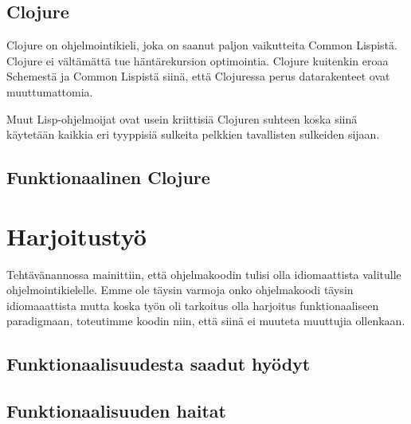 \documentclass[12pt]{article}
\begin{document}
\subsection{Clojure}
Clojure on ohjelmointikieli, joka on saanut paljon vaikutteita Common Lispistä. Clojure ei vältämättä tue häntärekursion optimointia. Clojure kuitenkin eroaa Schemestä ja Common Lispistä siinä, että Clojuressa perus datarakenteet ovat muuttumattomia. 

Muut Lisp-ohjelmoijat ovat usein kriittisiä Clojuren suhteen koska siinä käytetään kaikkia eri tyyppisiä sulkeita pelkkien tavallisten sulkeiden sijaan.
\subsection{Funktionaalinen Clojure}

\section{Harjoitustyö}
Tehtävänannossa mainittiin, että ohjelmakoodin tulisi olla idiomaattista valitulle ohjelmointikielelle.
Emme ole täysin varmoja onko ohjelmakoodi täysin idiomaaattista mutta koska työn oli tarkoitus olla harjoitus funktionaaliseen paradigmaan,
toteutimme koodin niin, että siinä ei muuteta muuttujia ollenkaan. 
\subsection{Funktionaalisuudesta saadut hyödyt}

\subsection{Funktionaalisuuden haitat}



\end{document}
